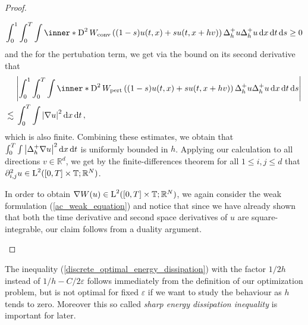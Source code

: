 \begin{proof}
\begin{description}[wide=0pt]
	\begin{equation*}
			\int_{ 0 }^{ 1 }
		\int_{ 0 }^{ T }
		\int
		\inner*{ 
			\diff^{ 2 } W_{ \mathrm{conv} } \left( ( 1- s ) u ( t, x  ) + s u( t,  x + h v ) \right) 
			\Delta_{ h }^{ + } u
		}{
			\Delta_{ h }^{ + } u 
		}
		\dd{ x }
		\dd{ t }
		\dd{ s }
		\geq 0 
	\end{equation*}
	and the for the pertubation term, we get via the bound on its second derivative that
	\begin{align*}
		& \abs{
		\int_{ 0 }^{ 1 }
		\int_{ 0 }^{ T }
		\int
		\inner*{ 
			\diff^{ 2 } W_{ \mathrm{pert} } \left( (1 - s ) u ( t, x  ) + s  u( t,  x + h v )  \right) 
			\Delta_{ h }^{ + } u
		}{
			\Delta_{ h }^{ + } u 
		}
		\dd{ x }
		\dd{ t }
		\dd{ s }
		}
		\\
		\lesssim {} &
		\int_{ 0 }^{ T }
			\int
				\abs{ \nabla u }^{ 2 }
			\dd{ x }
		\dd{ t },
	\end{align*}
	which is also finite. 
	Combining these estimates, we obtain that $ \int_{ 0 }^{ T } \int \abs{ \Delta_{ h }^{ + } \nabla u }^{ 2 } \dd{ x } \dd{ t } $ is uniformly bounded in $ h $. Applying our calculation to all directions $ v \in \mathbb{ R }^{ d } $, we get by the finite-differences theorem for all $ 1 \leq i, j \leq d $ that $ \partial_{ i , j }^{ 2 } u \in \operatorname{L}^{ 2 } ( [ 0 , T ] \times \operatorname{\mathbb{T}} ; \mathbb{ R }^{ N } ) $.
	
	In order to obtain $ \nabla W ( u ) \in \operatorname{L}^{ 2 } ( [ 0 , T ] \times \operatorname{\mathbb{T}} ; \mathbb{ R }^{ N } ) $, we again consider the weak formulation (\ref{ac_weak_equation}) and notice that since we have already shown that both the time derivative and second space derivatives of $ u $ are square-integrable, our claim follows from a duality argument. 
	\end{description}
\end{proof}

\begin{remark}
	The inequality (\ref{discrete_optimal_energy_dissipation}) with the factor $ 1/2h $ instead of $ 1/h- C/2\varepsilon $ follows immediately from the definition of our optimization problem, but is not optimal for fixed $ \varepsilon $ if we want to study the behaviour as $ h $ tends to zero. Moreover this so called \emph{sharp energy dissipation inequality} is important for later.
\end{remark}

